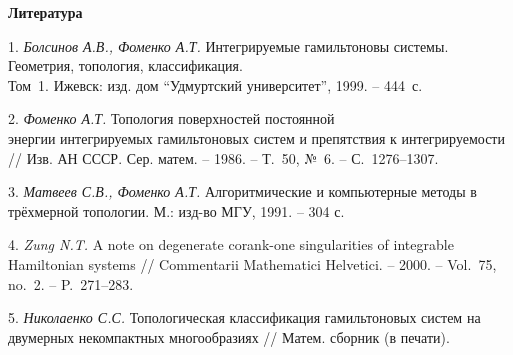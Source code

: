 \smallskip \centerline {\bf Литература} \nopagebreak

1. {\it Болсинов А.В., Фоменко А.Т.} Интегрируемые гамильтоновы системы. Геометрия, топология, классификация. \\ Том~1. Ижевск: изд. дом ``Удмуртский университет'', 1999. -- 444~с.

2. {\it Фоменко А.Т.} Топология поверхностей постоянной\\ энергии интегрируемых гамильтоновых систем и препятствия к интегрируемости // Изв. АН СССР. Сер. матем. -- 1986. -- Т.~50, №~6. -- С.~1276--1307.

3. {\it Матвеев С.В., Фоменко А.Т.} Алгоритмические и компьютерные методы в трёхмерной топологии. М.: изд-во МГУ, 1991. -- 304 с.

4. {\it Zung N.T.} A note on degenerate corank-one singularities of integrable Hamiltonian systems // Commentarii Mathematici Helvetici. -- 2000. -- Vol.~75, no.~2. -- P.~271--283.

5. {\it Николаенко С.С.} Топологическая классификация гамильтоновых систем на двумерных некомпактных многообразиях // Матем. сборник (в печати).


